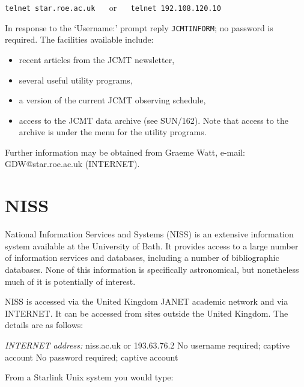 \documentclass[twoside,11pt]{article}
\newcommand{\xref}[3]{#1}
\newcommand{\xlabel}[1]{}
\begin{document}
\vspace{2.0 mm}
\verb:telnet star.roe.ac.uk: ~~ or ~~ \verb:telnet 192.108.120.10:
\vspace{2.0 mm}

In response to the `Username:' prompt reply {\tt JCMTINFORM}; no
password is required. The facilities available include:

\begin{itemize}

  \item recent articles from the JCMT newsletter,

  \item several useful utility programs,

  \item a version of the current JCMT observing schedule,

  \item access to the JCMT data archive (see \xref{SUN/162}{sun162}{}).
   Note that access
   to the archive is under the menu for the utility programs.

\end{itemize}

Further information may be obtained from Graeme Watt, e-mail:
GDW@star.roe.ac.uk
\newline (INTERNET).


\section{NISS
\xlabel{niss}\label{NISS}}

National Information Services and Systems (NISS) is an extensive
information system available at the University of Bath. It provides
access to a large number of information services and databases,
including a number of bibliographic databases. None of this information
is specifically astronomical, but nonetheless much of it is potentially
of interest.

NISS is accessed via the United Kingdom JANET academic network and via
INTERNET. It can be accessed from sites outside the United Kingdom. The
details are as follows:

{\it INTERNET address:} niss.ac.uk or 193.63.76.2
 No username required; captive account
 No password required; captive account

From a Starlink Unix system you would type:
\end{document}
